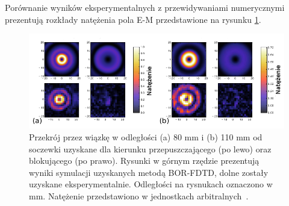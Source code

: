 Porównanie wyników eksperymentalnych z przewidywaniami numerycznymi prezentują rozkłady natężenia pola E-M przedstawione na rysunku \ref{fig:eksp-por}.

\begin{figure}
	\includegraphics[width=\textwidth]{images/thz/exp-express.png}
	\caption{Przekrój przez wiązkę w odległości (a) 80 mm i (b) 110 mm od soczewki uzyskane dla kierunku przepuszczającego (po lewo) oraz blokującego (po prawo). Rysunki w górnym rzędzie prezentują wyniki symulacji uzyskanych metodą BOR-FDTD, dolne zostały uzyskane eksperymentalnie. Odległości na rysnukach oznaczono w mm. Natężenie przedstawiono w jednostkach arbitralnych~\cite{Yavorskiy:14}.}
	\label{fig:eksp-por}
\end{figure}
	
